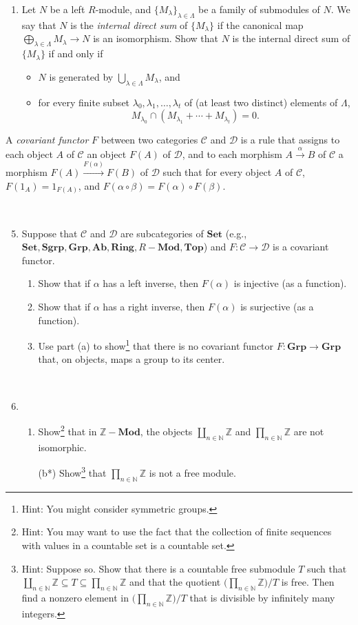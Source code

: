 \documentclass{amsart}[12pt]
\def\sC{\mathscr C}
\def\sD{\mathscr  D}
\newcommand{\Z}{\mathbb{Z}}
\newcommand{\N}{\mathbb{N}}
\numberwithin{equation}{section}
\theoremstyle{plain} %
\theoremstyle{definition}
\theoremstyle{remark}
\newcommand{\xra}[1]{\xrightarrow{#1}}
\newcommand{\Set}{\mathbf{Set}}
\newcommand{\Grp}{\mathbf{Grp}}
\newcommand{\Ab}{\mathbf{Ab}}
\newcommand{\Sgrp}{\mathbf{Sgrp}}
\newcommand{\Ring}{\mathbf{Ring}}
\newcommand{\Mod}[1]{#1-\mathbf{Mod}}
\newcommand{\Top}{\mathbf{Top}}
\begin{document}
\begin{enumerate}
\

\item Let $N$ be a left $R$-module, and $\{M_\lambda\}_{\lambda\in \Lambda}$ be a family of submodules of $N$.
We say that $N$ is the \emph{internal direct sum} of $\{M_\lambda\}$ if the canonical map $\bigoplus_{\lambda\in\Lambda} M_{\lambda} \to N$ is an isomorphism. Show that $N$ is the internal direct sum of $\{M_\lambda\}$ if and only if
\begin{itemize}
\item $N$ is generated by $\bigcup_{\lambda\in \Lambda} M_\lambda$, and
\item for every finite subset $\lambda_0,\lambda_1,\dots,\lambda_t$ of (at least two distinct) elements of $\Lambda$,
\[ M_{\lambda_0} \cap (M_{\lambda_1} + \cdots + M_{\lambda_t}) = 0.\]
\end{itemize}
\end{enumerate}


\noindent A \emph{covariant functor} $F$ between two categories $\sC$ and $\sD$ is a rule that assigns
to each object $A$ of $\sC$ an object $F(A)$ of $\sD$, and to each morphism $A\xra{\alpha}B$ of $\sC$ a morphism $F(A) \xra{F(\alpha)} F(B)$ of $\sD$ such that for every object $A$ of $\sC$, $F(1_A) = 1_{F(A)}$, and $F(\alpha\circ \beta) = F(\alpha)\circ F(\beta)$.

\


\begin{enumerate}\setcounter{enumi}{4}
\item 
Suppose that $\sC$ and $\sD$ are subcategories of $\Set$ (e.g., $\Set,\Sgrp,\Grp,\Ab,\Ring,\Mod{R},\Top$) and $F:\sC\to \sD$ is a covariant functor.
\begin{enumerate}
\item Show that if $\alpha$ has a left inverse, then $F(\alpha)$ is injective (as a function).
\item Show that if $\alpha$ has a right inverse, then $F(\alpha)$ is surjective (as a function).
\item Use part (a) to show\footnote{Hint: You might consider symmetric groups.} that there is no covariant functor $F:\Grp\to \Grp$ that, on objects, maps a group to its center.
\end{enumerate}

\
\item
\begin{enumerate}
\item Show\footnote{Hint: You may want to use the fact that the collection of finite sequences with values in a countable set is a countable set.} that in $\Mod{\Z}$, the objects $\coprod_{n\in \N} \Z$ and $\prod_{n\in \N} \Z$ are not isomorphic.
\item[(b*)] Show\footnote{Hint: Suppose so. Show that there is a countable free submodule $T$ such that $\coprod_{n\in \N} \Z \subseteq T \subseteq \prod_{n\in \N} \Z$ and that the quotient $ \big(\prod_{n\in \N} \Z\big) / T$ is free. Then find a nonzero element in $ \big(\prod_{n\in \N} \Z\big)/T$ that is divisible by infinitely many integers.} that $\prod_{n\in \N} \Z$ is not a free module.
\end{enumerate}
\end{enumerate}
\end{document}
